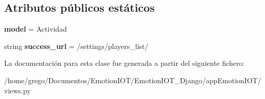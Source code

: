 \subsection*{Atributos públicos estáticos}
\begin{DoxyCompactItemize}
\item 
{\bfseries model} = Actividad\hypertarget{classappEmotionIOT_1_1views_1_1Actividad__delete_a468b01fe011666d36b40be45b2100bf0}{}\label{classappEmotionIOT_1_1views_1_1Actividad__delete_a468b01fe011666d36b40be45b2100bf0}

\item 
string {\bfseries success\+\_\+url} = \textquotesingle{}/settings/players\+\_\+list/\textquotesingle{}\hypertarget{classappEmotionIOT_1_1views_1_1Actividad__delete_a347944ebad13d7e917f919fa1035557d}{}\label{classappEmotionIOT_1_1views_1_1Actividad__delete_a347944ebad13d7e917f919fa1035557d}

\end{DoxyCompactItemize}


La documentación para esta clase fue generada a partir del siguiente fichero\+:\begin{DoxyCompactItemize}
\item 
/home/grego/\+Documentos/\+Emotion\+I\+O\+T/\+Emotion\+I\+O\+T\+\_\+\+Django/app\+Emotion\+I\+O\+T/views.\+py\end{DoxyCompactItemize}
